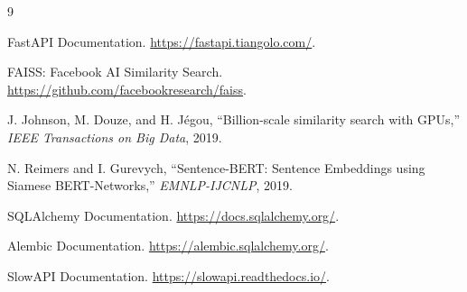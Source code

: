 \documentclass[12pt,a4paper]{article}
\begin{document}
\begin{thebibliography}{9}
\setlength{\itemsep}{1pt}

FastAPI Documentation. \url{https://fastapi.tiangolo.com/}.

FAISS: Facebook AI Similarity Search. \url{https://github.com/facebookresearch/faiss}.

J. Johnson, M. Douze, and H. J\'egou, ``Billion-scale similarity search with GPUs,'' \textit{IEEE Transactions on Big Data}, 2019.

N. Reimers and I. Gurevych, ``Sentence-BERT: Sentence Embeddings using Siamese BERT-Networks,'' \textit{EMNLP-IJCNLP}, 2019.

SQLAlchemy Documentation. \url{https://docs.sqlalchemy.org/}.

Alembic Documentation. \url{https://alembic.sqlalchemy.org/}.

SlowAPI Documentation. \url{https://slowapi.readthedocs.io/}.

\end{thebibliography}
\end{document}
